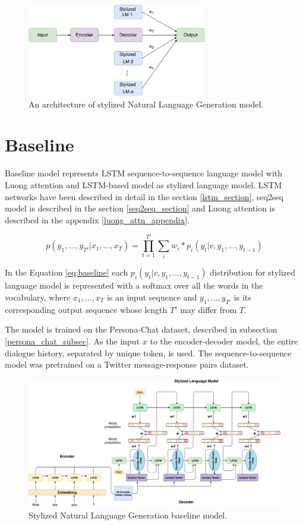 \begin{figure}[hbt]
  \centering
  \includegraphics[width=0.7\textwidth]{figures/model.pdf}
  \caption{An architecture of stylized Natural Language Generation model.}
  \label{architecture_nlg}
\end{figure}

\section{Baseline}
Baseline model represents LSTM sequence-to-sequence language model with Luong attention and LSTM-based model as stylized language model. LSTM networks have been described in detail in the section \ref{lstm_section}, seq2seq model is described in the section \ref{seq2seq_section} and Luong attention is described in the appendix \ref{luong_attn_appendix}.

\begin{equation} \label{eq:baseline}
p(y_1, ... , y_{T'}|x_1, ... , x_T) = \prod_{t=1}^{T'} \sum_i w_i * p_i(y_t|v, y_1, ... , y_{t-1})
\end{equation}

In the Equation \ref{eq:baseline} each $p_i(y_t|v, y_1, ... , y_{t-1})$ distribution for stylized language model is represented with a softmax over all the words in the vocabulary, where $x_1, ... , x_T$ is an input sequence and $y_1, ... , y_{T'}$ is its corresponding output sequence  whose length $T'$ may differ from $T$.

The model is trained on the Persona-Chat dataset, described in subsection \ref{persona_chat_subsec}. As the input $x$ to the encoder-decoder model, the entire dialogue history, separated by unique token, is used. The sequence-to-sequence model was pretrained on a Twitter message-response pairs dataset. 

\begin{figure}[hbt]
  \centering
  \includegraphics[width=1\textwidth]{figures/combine_models.pdf}
  \caption{Stylized Natural Language Generation baseline model.}
  \label{implementation_architecture}
\end{figure}

